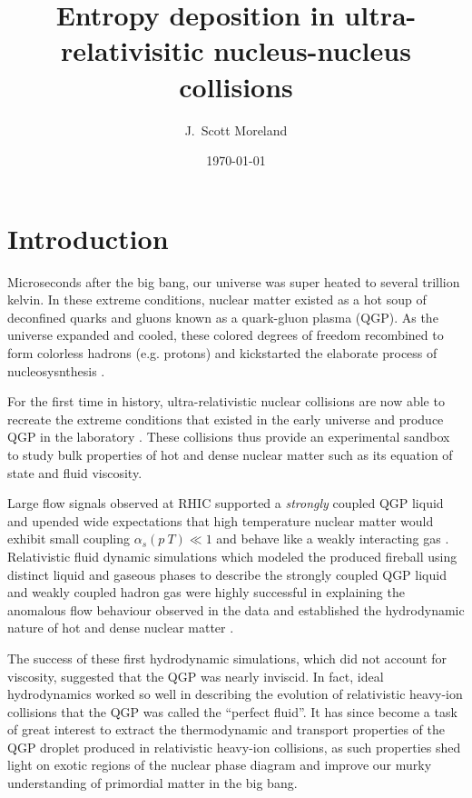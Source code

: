 \documentclass[aps,prc,reprint,amsmath,nofootinbib]{revtex4-1}
\begin{document}
\title{Entropy deposition in ultra-relativisitic nucleus-nucleus collisions}

\author{J.\ Scott Moreland}
\date{\today}

\maketitle

\section{Introduction}

Microseconds after the big bang, our universe was super heated to several trillion kelvin. In these extreme conditions, nuclear matter existed as a hot 
soup of deconfined quarks and gluons known as a quark-gluon plasma (QGP). As the universe expanded and cooled, these colored degrees of freedom recombined to 
form colorless hadrons (e.g. protons) and kickstarted the elaborate process of nucleosysnthesis \cite{Heinz:2004qz}.

For the first time in history, ultra-relativistic nuclear collisions are now able to recreate the extreme conditions that existed in the early universe and produce
QGP in the laboratory \cite{BNL}. These collisions thus provide an experimental sandbox to study bulk properties of hot and dense nuclear matter such as its equation 
of state and fluid viscosity.

Large flow signals observed at RHIC supported a \emph{strongly} coupled QGP liquid and upended wide expectations that high temperature nuclear matter would exhibit small coupling $\alpha_s(p~T) \ll 1$ and behave like a weakly interacting gas \cite{Shuryak:2004cy}. Relativistic fluid dynamic simulations which modeled 
the produced fireball using distinct liquid and gaseous phases to describe the strongly coupled QGP liquid and weakly coupled hadron gas were highly successful in 
explaining the anomalous flow behaviour observed in the data and established the hydrodynamic nature of hot and dense nuclear matter \cite{Kolb:2003dz}.

The success of these first hydrodynamic simulations, which did not account for viscosity, suggested that the QGP was nearly inviscid. In fact, ideal hydrodynamics 
worked so well in describing the evolution of relativistic heavy-ion collisions that the QGP was called the ``perfect fluid''. It has since become a task of great 
interest to extract the thermodynamic and transport properties of the QGP droplet produced in relativistic heavy-ion collisions, as such properties shed light on
exotic regions of the nuclear phase diagram and improve our murky understanding of primordial matter in the big bang.
\end{document}
